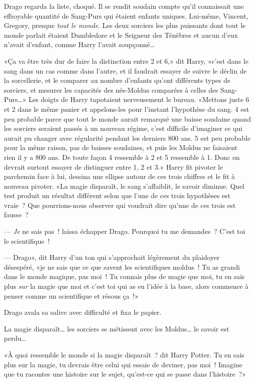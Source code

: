 Drago regarda la liste, choqué. Il se rendit soudain compte qu'il connaissait une effroyable quantité de Sang-Purs qui étaient enfants uniques. Lui-même, Vincent, Gregory, presque \emph{tout le monde}. Les deux sorciers les plus puissants dont tout le monde parlait étaient Dumbledore et le Seigneur des Ténèbres et aucun d'eux n'avait d'enfant, comme Harry l'avait soupçonné…

«Ça va être très dur de faire la distinction entre 2 et 6,» dit Harry, «c'est dans le sang dans un cas comme dans l'autre, et il faudrait essayer de suivre le déclin de la sorcellerie, et le comparer au nombre d'enfants qu'ont différents types de sorciers, et mesurer les capacités des nés-Moldus comparées à celles des Sang-Purs…» Les doigts de Harry tapotaient nerveusement le bureau. «Mettons juste 6 et 2 dans le même panier et appelons-les pour l'instant l'hypothèse du sang. 4 est peu probable parce que tout le monde aurait remarqué une baisse soudaine quand les sorciers seraient passés à un nouveau régime, c'est difficile d'imaginer ce qui aurait pu changer avec régularité pendant les derniers 800 ans. 5 est peu probable pour la même raison, pas de baisses soudaines, et puis les Moldus ne faisaient rien il y a 800 ans. De toute façon 4 ressemble à 2 et 5 ressemble à 1. Donc on devrait surtout essayer de distinguer entre 1, 2 et 3.» Harry fit pivoter le parchemin face à lui, dessina une ellipse autour de ces trois chiffres et le fit à nouveau pivoter. «La magie disparaît, le sang s'affaiblit, le savoir diminue. Quel test produit un résultat différent selon que l'une de ces trois hypothèses est vraie~? Que pourrions-nous observer qui voudrait dire qu'une de ces trois est fausse~?

--- \emph{Je} ne sais pas~! laissa échapper Drago. Pourquoi tu me demandes~? C'est toi le scientifique~!

--- Drago», dit Harry d'un ton qui s'approchait légèrement du plaidoyer désespéré, «je ne sais que ce que savent les scientifiques moldus~! Tu as grandi dans le monde magique, pas moi~! Tu connais plus de magie que moi, tu en sais plus \emph{sur} la magie que moi et c'est toi qui as eu l'idée à la base, alors commence à penser comme un scientifique et résous ça~!»

Drago avala sa salive avec difficulté et fixa le papier.

La magie disparaît… les sorciers se métissent avec les Moldus… le savoir est perdu…

«À quoi ressemble le monde si la magie disparaît~? dit Harry Potter. Tu en sais plus sur la magie, tu devrais être celui qui essaie de deviner, pas moi~! Imagine que tu racontes une histoire sur le sujet, qu'est-ce qui se passe dans l'histoire~?»


